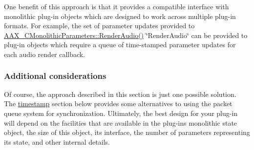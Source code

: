 One benefit of this approach is that it provides a compatible interface with monolithic plug-\/in objects which are designed to work across multiple plug-\/in formats. For example, the set of parameter updates provided to \mbox{\hyperlink{a01969_a04f2f73d70ea28c17747c68fc3a20fc8}{A\+A\+X\+\_\+\+C\+Monolithic\+Parameters\+::\+Render\+Audio()}} \char`\"{}\+Render\+Audio\char`\"{} can be provided to plug-\/in objects which require a queue of time-\/stamped parameter updates for each audio render callback.\hypertarget{a00821_parameterUpdateTiming_considerations}{}\subsubsection{Additional considerations}\label{a00821_parameterUpdateTiming_considerations}
Of course, the approach described in this section is just one possible solution. The \mbox{\hyperlink{a00821_parameterUpdateTiming_timestamps}{timestamp}} section below provides some alternatives to using the packet queue system for synchronization. Ultimately, the best design for your plug-\/in will depend on the facilities that are available in the plug-\/in\textquotesingle{}s monolithic state object, the size of this object, its interface, the number of parameters representing its state, and other internal details.

